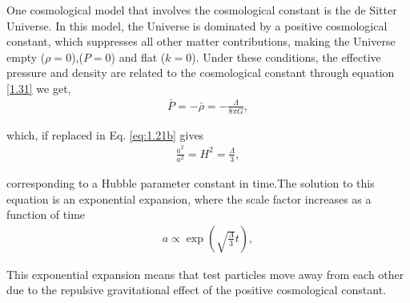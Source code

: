 One cosmological model that involves the cosmological constant is the de Sitter Universe. In this model, the Universe is dominated by a positive cosmological constant, which suppresses all other matter contributions, making the Universe empty ($\rho=0$),($P = 0$) and flat ($k=0$). Under these conditions, the effective pressure and density are related to the cosmological constant through equation \eqref{1.31} we get,
\begin{align}
   \bar{P}=-\bar{\rho}=-\frac{\Lambda}{8 \pi G}, \label{1.32}
\end{align}

which, if replaced in Eq. \eqref{eq:1.21b} gives
\begin{align}
    \frac{\dot{a}^2}{a^2}=H^2=\frac{\Lambda}{3},\label{1.33}
\end{align}

corresponding to a Hubble parameter constant in time.The solution to
this equation is an exponential expansion, where the scale factor increases as a function of time
\begin{align}
    a \propto \exp \left(\sqrt{\frac{\Lambda}{3}} t\right),\label{1.34}
\end{align}


This exponential expansion means that test particles move away from
each other due to the repulsive gravitational effect of the positive cosmological constant.



